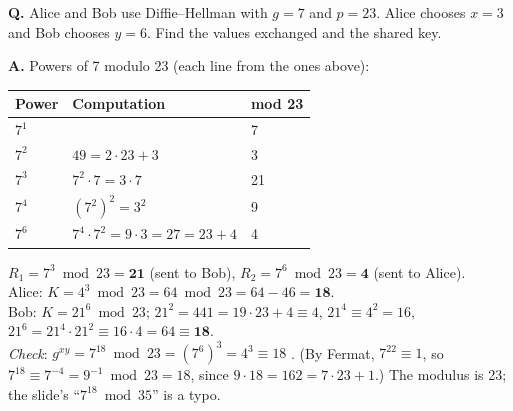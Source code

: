 \begin{worked}
\textbf{Q.} Alice and Bob use Diffie--Hellman with $g = 7$ and $p = 23$. Alice chooses $x = 3$ and Bob chooses $y = 6$. Find the values exchanged and the shared key.

\textbf{A.} Powers of 7 modulo 23 (each line from the ones above):
\begin{center}\small
\begin{tabular}{@{}lll@{}}
\toprule
Power & Computation & mod 23\\
\midrule
$7^1$ & & 7\\
$7^2$ & $49 = 2 \cdot 23 + 3$ & 3\\
$7^3$ & $7^2 \cdot 7 = 3 \cdot 7$ & 21\\
$7^4$ & $(7^2)^2 = 3^2$ & 9\\
$7^6$ & $7^4 \cdot 7^2 = 9 \cdot 3 = 27 = 23 + 4$ & 4\\
\bottomrule
\end{tabular}
\end{center}
$R_1 = 7^3 \bmod 23 = \mathbf{21}$ (sent to Bob), \quad $R_2 = 7^6 \bmod 23 = \mathbf{4}$ (sent to Alice).\\
Alice: $K = 4^3 \bmod 23 = 64 \bmod 23 = 64 - 46 = \mathbf{18}$.\\
Bob: $K = 21^6 \bmod 23$; $21^2 = 441 = 19 \cdot 23 + 4 \equiv 4$, $21^4 \equiv 4^2 = 16$, $21^6 = 21^4 \cdot 21^2 \equiv 16 \cdot 4 = 64 \equiv \mathbf{18}$.\\
\emph{Check}: $g^{xy} = 7^{18} \bmod 23 = (7^6)^3 = 4^3 \equiv 18$ \checkmark. (By Fermat, $7^{22} \equiv 1$, so $7^{18} \equiv 7^{-4} = 9^{-1} \bmod 23 = 18$, since $9 \cdot 18 = 162 = 7 \cdot 23 + 1$.) The modulus is 23; the slide's ``$7^{18} \bmod 35$'' is a typo.
\end{worked}

